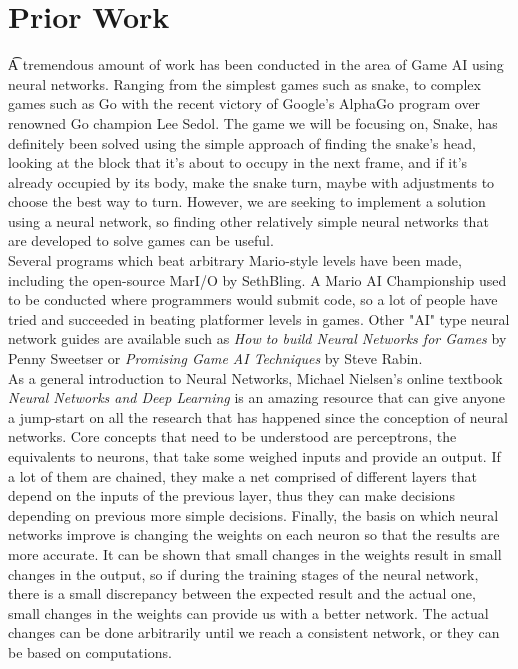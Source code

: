 \documentclass[preprint]{sigplanconf}
\begin{document}
\section{Prior Work}
\t A tremendous amount of work has been conducted in the area of Game AI using neural networks. Ranging from the simplest games such as snake, to complex games such as Go with the recent victory of Google's AlphaGo program over renowned Go champion Lee Sedol. The game we will be focusing on, Snake, has definitely been solved using the simple approach of finding the snake's head, looking at the block that it's about to occupy in the next frame, and if it's already occupied by its body, make the snake turn, maybe with adjustments to choose the best way to turn. However, we are seeking to implement a solution using a neural network, so finding other relatively simple neural networks that are developed to solve games can be useful.\\
Several programs which beat arbitrary Mario-style levels have been made, including the open-source MarI/O by SethBling. A Mario AI Championship used to be conducted where programmers would submit code, so a lot of people have tried and succeeded in beating platformer levels in games. Other "AI" type neural network guides are available such as \textit{How to build Neural Networks for Games} by Penny Sweetser or \textit{Promising Game AI Techniques} by Steve Rabin.\\
As a general introduction to Neural Networks, Michael Nielsen's online textbook \textit{Neural Networks and Deep Learning} is an amazing resource that can give anyone a jump-start on all the research that has happened since the conception of neural networks. Core concepts that need to be understood are perceptrons, the equivalents to neurons, that take some weighed inputs and provide an output. If a lot of them are chained, they make a net comprised of different layers that depend on the inputs of the previous layer, thus they can make decisions depending on previous more simple decisions. Finally, the basis on which neural networks improve is changing the weights on each neuron so that the results are more accurate. It can be shown that small changes in the weights result in small changes in the output, so if during the training stages of the neural network, there is a small discrepancy between the expected result and the actual one, small changes in the weights can provide us with a better network. The actual changes can be done arbitrarily until we reach a consistent network, or they can be based on computations.\\
\end{document}
